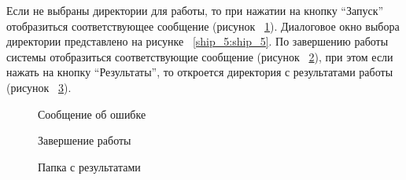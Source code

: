 Если не выбраны директории для работы, то при нажатии на кнопку “Запуск” отобразиться соответствующее сообщение (рисунок ~\ref{ship_6:ship_6}). Диалоговое окно выбора директории представлено на рисунке ~\ref{ship_5:ship_5}. По завершению работы системы отобразиться соответствующие сообщение (рисунок ~\ref{ship_7:ship_7}), при этом если нажать на кнопку “Результаты”, то откроется директория с результатами работы (рисунок ~\ref{ship_8:ship_8}).

\begin{figure}[h!]
\caption{ Сообщение об ошибке }
\label{ship_6:ship_6}
\end{figure}

\begin{figure}[h!]
\caption{ Завершение работы }
\label{ship_7:ship_7}
\end{figure}

\begin{figure}[h!]
\caption{ Папка с результатами }
\label{ship_8:ship_8}
\end{figure}

\clearpage
